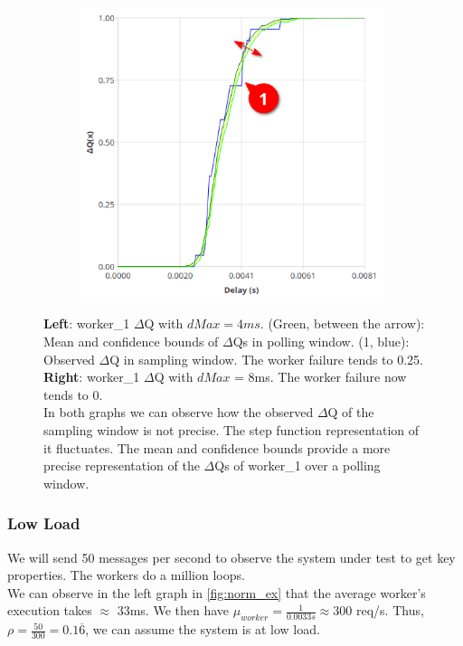 \begin{figure}[H]
\begin{subfigure}{.5\textwidth}
                \includegraphics[width =0.98\textwidth]{img/overload_2/worker_1_8a.png}
                \label{fig:w18}
            \end{subfigure}
            \caption{\textbf{Left}: worker\_1 $\Delta$Q with $dMax = 4ms$. (Green, between the arrow): Mean and confidence bounds of $\Delta$Qs in polling window. (1, blue): Observed $\Delta$Q in sampling window. The worker failure tends to 0.25. \\
            \textbf{Right}: worker\_1 $\Delta$Q with $dMax$ = 8ms. The worker failure now tends to 0. \\
            In both graphs we can observe how the observed $\Delta$Q of the sampling window is not precise. The step function representation of it fluctuates. The mean and confidence bounds provide a more precise representation of the $\Delta$Qs of worker\_1 over a polling window.}%
            \label{fig:w1w2hb}
            \end{figure}

    \subsubsection{Low Load} 
   We will send 50 messages per second to observe the system under test to get key properties. The workers do a million loops. \\
    We can observe in the left graph in \cref{fig:norm_ex} that the average worker's execution takes $\approx$ 33ms. We then have $\mu_{worker} = \frac{1}{0.0033 s} \approx 300$ req/s. Thus, $\rho = \frac{50}{300} = 0.1\overline{6}$, we can assume the system is at low load.

